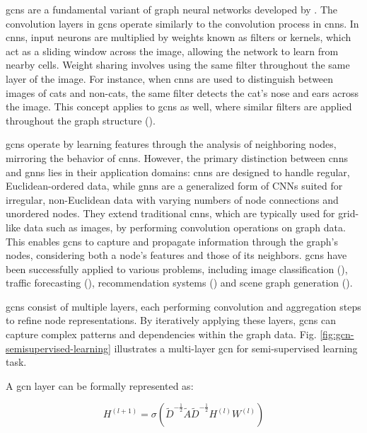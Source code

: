 \glspl{gcn} are a fundamental variant of graph neural networks developed by \cite{Kipf2017}.
The convolution layers in \glspl{gcn} operate similarly to the convolution process in \glspl{cnn}.
In \glspl{cnn}, input neurons are multiplied by weights known as filters or kernels, which act as a sliding window across the image, allowing the network to learn from nearby cells.
Weight sharing involves using the same filter throughout the same layer of the image.
For instance, when \glspl{cnn} are used to distinguish between images of cats and non-cats, the same filter detects the cat's nose and ears across the image.
This concept applies to \glspl{gcn} as well, where similar filters are applied throughout the graph structure (\cite{Kipf2017}).

\glspl{gcn} operate by learning features through the analysis of neighboring nodes, mirroring the behavior of \glspl{cnn}.
However, the primary distinction between \glspl{cnn} and \glspl{gnn} lies in their application domains: \glspl{cnn} are designed to handle regular, Euclidean-ordered data, while \glspl{gnn} are a generalized form of CNNs suited for irregular, non-Euclidean data with varying numbers of node connections and unordered nodes.
They extend traditional \glspl{cnn}, which are typically used for grid-like data such as images, by performing convolution operations on graph data.
This enables \glspl{gcn} to capture and propagate information through the graph's nodes, considering both a node's features and those of its neighbors.
\glspl{gcn} have been successfully applied to various problems, including image classification (\cite{Monti2016}), traffic forecasting (\cite{Cui2020}), recommendation systems (\cite{Fan2019}) and scene graph generation (\cite{Yang_2018_ECCV}).

\glspl{gcn} consist of multiple layers, each performing convolution and aggregation steps to refine node representations.
By iteratively applying these layers, \glspl{gcn} can capture complex patterns and dependencies within the graph data.
Fig. \ref{fig:gcn-semisupervised-learning} illustrates a multi-layer \gls{gcn} for semi-supervised learning task.

A \gls{gcn} layer can be formally represented as:

\[ H^{(l+1)} = \sigma\left(\tilde{D}^{-\frac{1}{2}}\tilde{A}\tilde{D}^{-\frac{1}{2}} H^{(l)} W^{(l)}\right) \]

